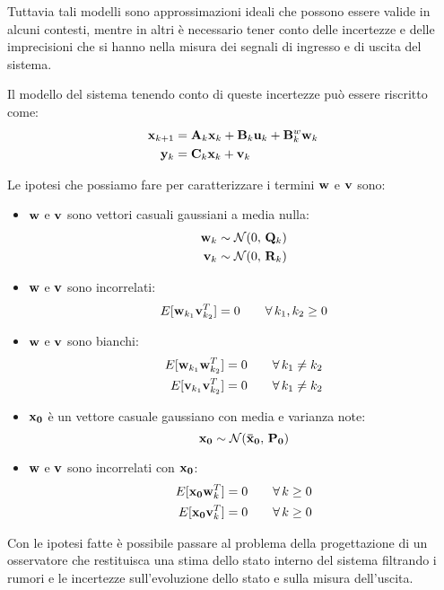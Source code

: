 Tuttavia tali modelli sono approssimazioni ideali che possono essere valide in alcuni contesti, mentre in altri è necessario tener conto delle incertezze e delle imprecisioni che si hanno nella misura dei segnali di ingresso e di uscita del sistema.

Il modello del sistema tenendo conto di queste incertezze può essere riscritto come:
\begin{align*}
\mathbf{x}_{k+1} &= \mathbf{A}_k\mathbf{x}_k + \mathbf{B}_k\mathbf{u}_k + \mathbf{B}^w_k\mathbf{w}_k \\
\mathbf{y}_k &= \mathbf{C}_k\mathbf{x}_k + \mathbf{v}_k
\end{align*}

\noindent Le ipotesi che possiamo fare per caratterizzare i termini $\mathbf{w}$ e $\mathbf{v}$ sono:
\begin{itemize}
\item $\mathbf{w}$ e $\mathbf{v}$ sono vettori casuali gaussiani a media nulla: 
\begin{align*}
 \mathbf{w}_k &\sim \mathcal{N}(0,\,\mathbf{Q}_k) \\
 \mathbf{v}_k &\sim \mathcal{N}(0,\,\mathbf{R}_k)
\end{align*}
\item $\mathbf{w}$ e $\mathbf{v}$ sono incorrelati:
 \[E[\mathbf{w}_{k_1}\mathbf{v}^T_{k_2}]=0\qquad \forall\, k_1,k_2 \geq 0\]
\item $\mathbf{w}$ e $\mathbf{v}$ sono bianchi: 
\begin{align*}
 E[\mathbf{w}_{k_1}\mathbf{w}^T_{k_2}]&=0\qquad \forall\, k_1 \neq k_2 \\
 E[\mathbf{v}_{k_1}\mathbf{v}^T_{k_2}]&=0\qquad \forall\, k_1 \neq k_2
\end{align*}
\item $\mathbf{x_0}$ è un vettore casuale gaussiano con media e varianza note:
\[\mathbf{x_0} \sim \mathcal{N}(\mathbf{\bar{x}_0},\,\mathbf{P_0})\]
\item $\mathbf{w}$ e $\mathbf{v}$ sono incorrelati con $\mathbf{x_0}$:
\begin{align*}
 E[\mathbf{x_0}\mathbf{w}^T_k]&=0\qquad \forall\, k \geq 0 \\
 E[\mathbf{x_0}\mathbf{v}^T_k]&=0\qquad \forall\, k \geq 0
\end{align*}
\end{itemize}

Con le ipotesi fatte è possibile passare al problema della progettazione di un osservatore che restituisca una stima dello stato interno del sistema filtrando i rumori e le incertezze sull'evoluzione dello stato e sulla misura dell'uscita.
\newpage